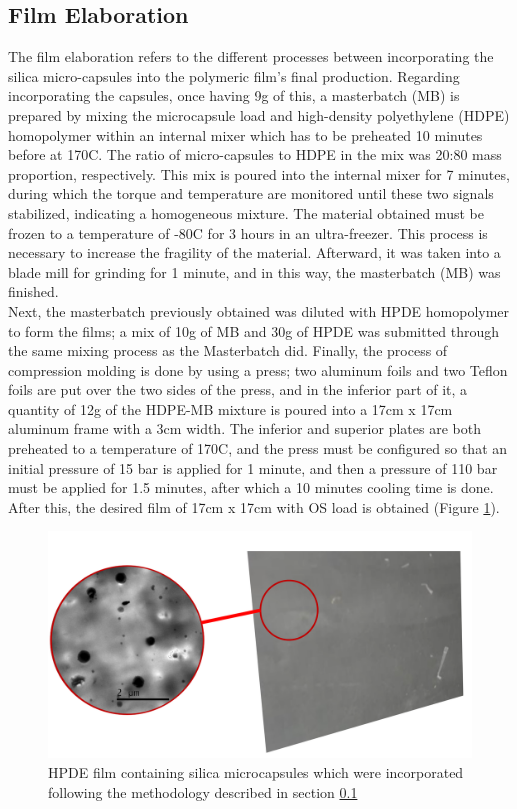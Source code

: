 \begin{refsection}
\subsection{Film Elaboration} \label{sec:film_elaboration}
The film elaboration refers to the different processes between incorporating the silica micro-capsules into the polymeric film's final production. Regarding incorporating the capsules, once having 9g of this, a masterbatch (MB) is prepared by mixing the microcapsule load and high-density polyethylene (HDPE) homopolymer within an internal mixer which has to be preheated 10 minutes before at 170\degree C. The ratio of micro-capsules to HDPE in the mix was 20:80 mass proportion, respectively. This mix is poured into the internal mixer for 7 minutes, during which the torque and temperature are monitored until these two signals stabilized, indicating a homogeneous mixture. The material obtained must be frozen to a temperature of -80\degree C for 3 hours in an ultra-freezer. This process is necessary to increase the fragility of the material. Afterward, it was taken into a blade mill for grinding for 1 minute, and in this way, the masterbatch (MB) was finished. \\

Next, the masterbatch previously obtained was diluted with HPDE homopolymer to form the films; a mix of 10g of MB and 30g of HPDE was submitted through the same mixing process as the Masterbatch did. Finally, the process of compression molding is done by using a press;  two aluminum foils and two Teflon foils are put over the two sides of the press, and in the inferior part of it, a quantity of 12g of the HDPE-MB mixture is poured into a 17cm x 17cm aluminum frame with a 3cm width. The inferior and superior plates are both preheated to a temperature of 170\degree C, and the press must be configured so that an initial pressure of 15 bar is applied for 1 minute, and then a pressure of 110 bar must be applied for 1.5 minutes, after which a 10 minutes cooling time is done. After this, the desired film of 17cm x 17cm with OS load is obtained (Figure \ref{fig:film}).

\begin{figure}[ht]
    \centering
    \includegraphics[width=0.6\linewidth]{Imagenes/pelicula.png}
    \caption{HPDE film containing silica microcapsules which were incorporated following the methodology described in section \ref{sec:film_elaboration} \cite{ArellanoAyala2019EfectosAntioxidantes}}
    \label{fig:film}
\end{figure}


\end{refsection}
